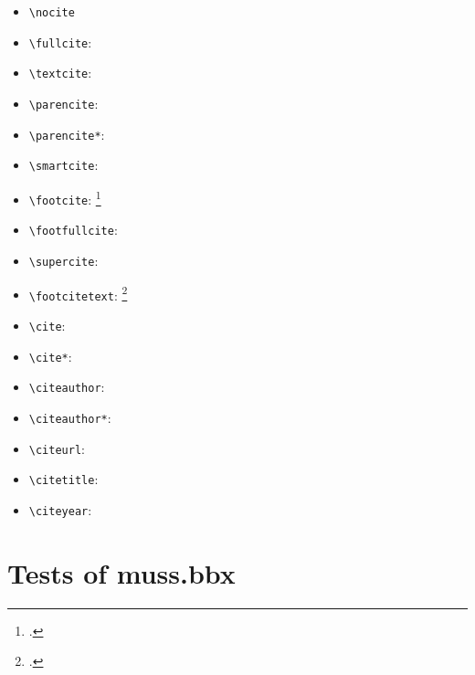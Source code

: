 \begin{itemize}
\item \verb=\nocite= \nocite{VanValin:05} \nocite{Abney:87} \nocite{Bach:80,Bach:81} \nocite{Zwicky:93} \nocite{Haagsma:etal:19-casting} \nocite{Corbett:etal:eds:93-heads} \nocite{Mueller:20-grammatical} \nocite{Penn:99-optimized} \nocite{McConnel:97-PC-PATR}
\item \verb=\fullcite=:  
\item \verb=\textcite=: \textcite{Nallapati:etal:16}
\item \verb=\parencite=: \parencite{Nallapati:etal:16}
\item \verb=\parencite*=: \parencite*{Nallapati:etal:16}
\item \verb=\smartcite=: \smartcite{Nallapati:etal:16}
\item \verb=\footcite=: \footcite{Nallapati:etal:16}
\item \verb=\footfullcite=:  
\item \verb=\supercite=: \supercite{Nallapati:etal:16}
\item \verb=\footcitetext=: \footcitetext{Nallapati:etal:16}
\item \verb=\cite=:  \cite{Nallapati:etal:16}
\item \verb=\cite*=:  \cite*{Nallapati:etal:16}
\item \verb=\citeauthor=: \citeauthor{Nallapati:etal:16}
\item \verb=\citeauthor*=: \citeauthor*{Nallapati:etal:16}
\item \verb=\citeurl=: 
\item \verb=\citetitle=: 
\item \verb=\citeyear=: \citeyear{Nallapati:etal:16}
\end{itemize} 

\newpage

\section{Tests of muss.bbx}

\printbibliography 


